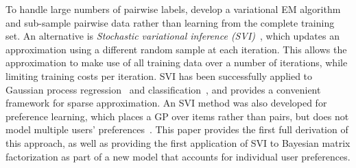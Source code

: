 To handle large numbers of pairwise labels, \citet{khan2014scalable}
develop a variational EM algorithm and sub-sample pairwise data rather than learning from the complete training set.
An alternative is \emph{Stochastic variational inference (SVI)}~\citep{hoffman2013stochastic}, which updates an approximation using 
 a different random sample at each iteration. 
 This allows the approximation to make use of all training data over a number of 
 iterations, while limiting training costs per iteration.
SVI has been successfully applied to Gaussian process regression~\citep{hensman2013gaussian} and classification~\citep{hensman2015scalable},
and provides a convenient framework for sparse approximation.
 An SVI method was also developed for preference learning,
 which places a GP over items rather than pairs, but does not model multiple users' preferences~\citep{simpson2018finding}.
This paper provides the first full derivation of this approach, %
as well as providing the first application of SVI to Bayesian matrix factorization
as part of a new model that accounts for individual user preferences.
